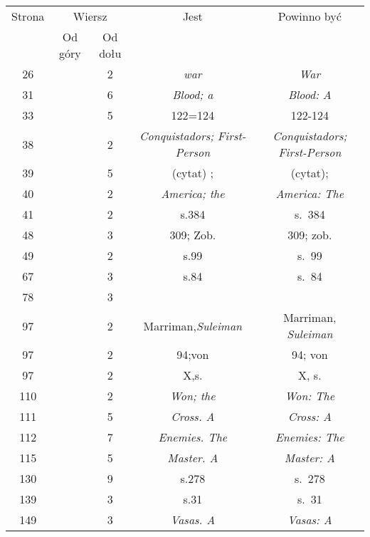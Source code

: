 \documentclass[a4paper,11pt]{article}
\begin{document}
\begin{center}

  \begin{tabular}{|c|c|c|c|c|}
    \hline
    Strona & \multicolumn{2}{c|}{Wiersz} & Jest
                              & Powinno być \\ \cline{2-3}
    & Od góry & Od dołu & & \\
    \hline
    \hphantom{0}26 & & \hphantom{0}2 & \textit{war} & \textit{War} \\
    \hphantom{0}31 & & \hphantom{0}6 & \textit{Blood; a}
    & \textit{Blood: A} \\
    \hphantom{0}33 & & \hphantom{0}5 & 122=124 & 122-124 \\
    \hphantom{0}38 & & \hphantom{0}2 & \textit{Conquistadors; First-Person}
    & \textit{Conquistadors; First-Person} \\
    \hphantom{0}39 & & \hphantom{0}5 & (cytat) ; & (cytat); \\
    \hphantom{0}40 & & \hphantom{0}2 & \textit{America; the}
    & \textit{America: The} \\
    \hphantom{0}41 & & \hphantom{0}2 & s.384 & s.~384 \\
    \hphantom{0}48 & & \hphantom{0}3 & 309; Zob. & 309; zob. \\
    \hphantom{0}49 & & \hphantom{0}2 & s.99 & s.~99 \\
    \hphantom{0}67 & & \hphantom{0}3 & s.84 & s.~84 \\
    \hphantom{0}78 & & \hphantom{0}3 & & \\
    \hphantom{0}97 & & \hphantom{0}2 & Marriman,\textit{Suleiman}
    & Marriman, \textit{Suleiman} \\
    \hphantom{0}97 & & \hphantom{0}2 & 94;von & 94; von\\
    \hphantom{0}97 & & \hphantom{0}2 & X,s.& X, s. \\
    110 & & \hphantom{0}2 & \textit{Won; the} & \textit{Won: The} \\
    111 & & \hphantom{0}5 & \textit{Cross. A} & \textit{Cross: A} \\
    112 & & \hphantom{0}7 & \textit{Enemies. The} & \textit{Enemies: The} \\
    115 & & \hphantom{0}5 & \textit{Master. A} & \textit{Master: A} \\
    130 & & \hphantom{0}9 & s.278 & s.~278 \\
    139 & & \hphantom{0}3 & s.31 & s.~31 \\
    149 & & \hphantom{0}3 & \textit{Vasas. A} & \textit{Vasas: A} \\

\end{tabular}
\end{center}
\end{document}
